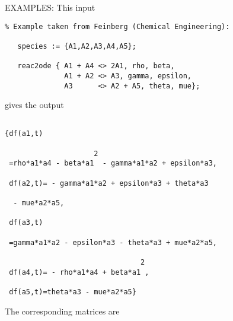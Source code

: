 EXAMPLES:
This input
\begin{verbatim}
% Example taken from Feinberg (Chemical Engineering):

   species := {A1,A2,A3,A4,A5};

   reac2ode { A1 + A4 <> 2A1, rho, beta,
              A1 + A2 <> A3, gamma, epsilon,
              A3      <> A2 + A5, theta, mue};
\end{verbatim}
gives the output
\begin{verbatim}

{df(a1,t)

                     2
 =rho*a1*a4 - beta*a1  - gamma*a1*a2 + epsilon*a3,

 df(a2,t)= - gamma*a1*a2 + epsilon*a3 + theta*a3

  - mue*a2*a5,

 df(a3,t)

 =gamma*a1*a2 - epsilon*a3 - theta*a3 + mue*a2*a5,

                                2
 df(a4,t)= - rho*a1*a4 + beta*a1 ,

 df(a5,t)=theta*a3 - mue*a2*a5}

\end{verbatim}
The corresponding matrices are
